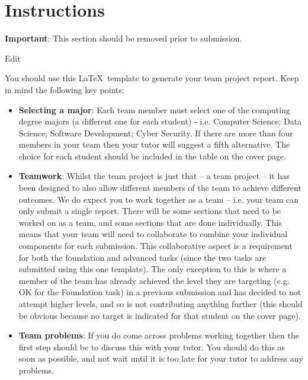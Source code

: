 \documentclass[a4paper, 11pt]{report}
\begin{document}

\tableofcontents


\newpage
\section*{Instructions}

\textbf{Important}: This section should be removed prior to submission.

Edit

You should use this \LaTeX\ template to generate your team project report. Keep in mind the following key points:
\begin{itemize}
	\item \textbf{Selecting a major}: Each team member must select one of the computing degree majors (a different one for each student) - i.e. Computer Science; Data Science; Software Development; Cyber Security. If there are more than four members in your team then your tutor will suggest a fifth alternative. The choice for each student should be included in the table on the cover page.
	\item \textbf{Teamwork}: Whilst the team project is just that -- a team project -- it has been designed to also allow different members of the team to achieve different outcomes. We do expect you to work together as a team -- i.e. your team can only submit a single report. There will be some sections that need to be worked on as a team, and some sections that are done individually. This means that your team will need to collaborate to combine your individual components for each submission. This collaborative aspect is a requirement for both the foundation and advanced tasks (since the two tasks are submitted using this one template). The only exception to this is where a member of the team has already achieved the level they are targeting (e.g. OK for the Foundation task) in a previous submission and has decided to not attempt higher levels, and so is not contributing anything further (this should be obvious because no target is indicated for that student on the cover page).
	\item \textbf{Team problems}: If you do come across problems working together then the first step should be to discuss this with your tutor. You should do this as soon as possible, and not wait until it is too late for your tutor to address any problems.

\end{itemize}
\end{document}
